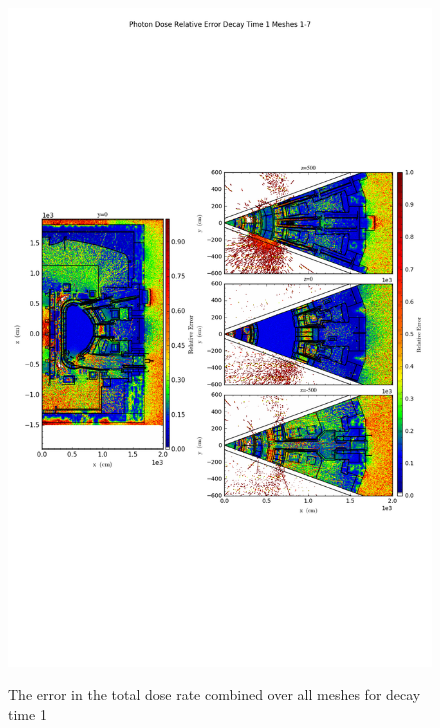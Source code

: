 \documentclass[12pt]{article}
\begin{document}
\begin{figure}[ht!]
\centering
\includegraphics[trim={0cm 9cm 0cm 10cm},clip,scale=0.75]{../plots/final_model_nob4c/Photon_Dose_Relative_Error_Decay_Time_1_Meshes_1-7.png}
\label{fig:photons_dc1_no4bc_total_error}
\caption{The error in the total dose rate combined over all meshes for decay time 1}
\end{figure}
\end{document}

